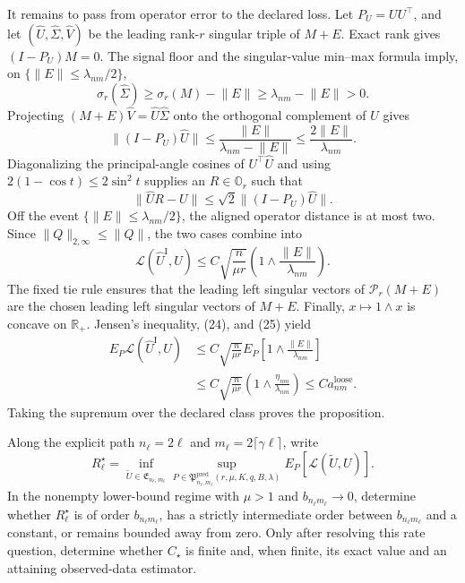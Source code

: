 It remains to pass from operator error to the declared loss.  Let \(P_U=UU^\top\), and let \((\widehat U,\widehat\Sigma,\widehat V)\) be the leading rank-\(r\) singular triple of \(M+E\).  Exact rank gives \((I-P_U)M=0\).  The signal floor and the singular-value min--max formula imply, on \(\{\lVert E\rVert\le\lambda_{nm}/2\}\),
\[
 \sigma_r(\widehat\Sigma)
 \ge\sigma_r(M)-\lVert E\rVert
 \ge\lambda_{nm}-\lVert E\rVert>0.
\]
Projecting \((M+E)\widehat V=\widehat U\widehat\Sigma\) onto the orthogonal complement of \(U\) gives
\[
 \lVert(I-P_U)\widehat U\rVert
 \le\frac{\lVert E\rVert}{\lambda_{nm}-\lVert E\rVert}
 \le\frac{2\lVert E\rVert}{\lambda_{nm}}.
\]
Diagonalizing the principal-angle cosines of \(U^\top\widehat U\) and using \(2(1-\cos t)\le2\sin^2t\) supplies an \(R\in\mathbb O_r\) such that
\[
 \lVert\widehat UR-U\rVert
 \le\sqrt2\lVert(I-P_U)\widehat U\rVert.
\]
Off the event \(\{\lVert E\rVert\le\lambda_{nm}/2\}\), the aligned operator distance is at most two.  Since \(\lVert Q\rVert_{2,\infty}\le\lVert Q\rVert\), the two cases combine into
\[
 \mathcal L(\widehat U^{\mathrm I},U)
 \le C\sqrt{\frac n{\mu r}}
 \left(1\wedge\frac{\lVert E\rVert}{\lambda_{nm}}\right).
 \tag{25}
\]
The fixed tie rule ensures that the leading left singular vectors of \(\mathcal P_r(M+E)\) are the chosen leading left singular vectors of \(M+E\).  Finally, \(x\mapsto1\wedge x\) is concave on \(\mathbb R_+\).  Jensen's inequality, (24), and (25) yield
\[
 \begin{aligned}
 E_P\mathcal L(\widehat U^{\mathrm I},U)
 &\le C\sqrt{\frac n{\mu r}}
 E_P\left[1\wedge\frac{\lVert E\rVert}{\lambda_{nm}}\right]\\
 &\le C\sqrt{\frac n{\mu r}}
 \left(1\wedge\frac{\eta_{nm}}{\lambda_{nm}}\right)
 \le C a^{\mathrm{loose}}_{nm}.
 \end{aligned}
\]
Taking the supremum over the declared class proves the proposition.

Along the explicit path \(n_\ell=2\ell\) and \(m_\ell=2\lceil\gamma\ell\rceil\), write
\[
 R^\star_\ell=
 \inf_{\widetilde U\in\mathfrak E_{n_\ell,m_\ell}}
 \sup_{P\in\mathfrak P^{\mathrm{pred}}_{n_\ell,m_\ell}(r,\mu,K,q,B,\lambda)}
 E_P[\mathcal L(\widetilde U,U)].
\]
In the nonempty lower-bound regime with \(\mu>1\) and \(b_{n_\ell m_\ell}\to0\), determine whether \(R^\star_\ell\) is of order \(b_{n_\ell m_\ell}\), has a strictly intermediate order between \(b_{n_\ell m_\ell}\) and a constant, or remains bounded away from zero.  Only after resolving this rate question, determine whether \(C_\star\) is finite and, when finite, its exact value and an attaining observed-data estimator.

